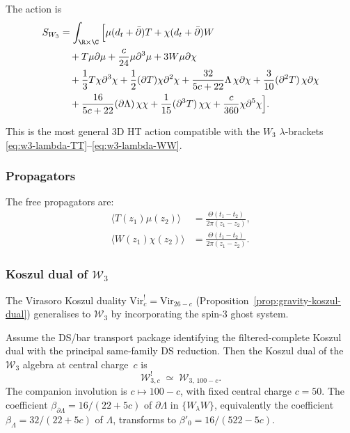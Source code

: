The action is
\begin{align}
S_{W_3} &= \int_{\R \times \C} \Big[ \mu (d_t + \bar{\partial})T + \chi (d_t + \bar{\partial})W \notag\\
&\quad + T \mu \partial \mu + \frac{c}{24} \mu \partial^3 \mu + 3W \mu \partial \chi \notag\\
&\quad + \frac{1}{3}T \chi \partial^3 \chi + \frac{1}{2}(\partial T) \chi \partial^2 \chi + \frac{32}{5c+22}\Lambda\, \chi \partial \chi + \frac{3}{10}(\partial^2 T)\,\chi \partial \chi \notag\\
&\quad + \frac{16}{5c+22}(\partial\Lambda)\, \chi \chi + \frac{1}{15}(\partial^3 T)\,\chi \chi + \frac{c}{360} \chi \partial^5 \chi \Big].
\end{align}

This is the most general 3D HT action compatible with the $W_3$ $\lambda$-brackets \eqref{eq:w3-lambda-TT}--\eqref{eq:w3-lambda-WW}.

\subsubsection{Propagators}

The free propagators are:
\begin{align}
\langle T(z_1) \mu(z_2) \rangle &= \frac{\Theta(t_1-t_2)}{2\pi(z_1-z_2)},\\
\langle W(z_1) \chi(z_2) \rangle &= \frac{\Theta(t_1-t_2)}{2\pi(z_1-z_2)}.
\end{align}


\subsubsection{Koszul dual of $\mathcal{W}_3$}
\label{subsubsec:w3-koszul-dual}
%
%

The Virasoro Koszul duality $\mathrm{Vir}_c^! = \mathrm{Vir}_{26-c}$
(Proposition~\ref{prop:gravity-koszul-dual})
generalises to $\mathcal{W}_3$ by incorporating the spin-$3$ ghost
system.

\begin{theorem}
\label{thm:w3-koszul-dual}
Assume the DS/bar transport package identifying the filtered-complete
Koszul dual with the principal same-family DS reduction. Then the
Koszul dual of the $\mathcal{W}_3$ algebra at central charge~$c$ is
\begin{equation}
\label{eq:w3-koszul-dual}
\mathcal{W}_{3,c}^!
\;\simeq\;
\mathcal{W}_{3,\,100-c}.
\end{equation}
The companion involution is $c \mapsto 100 - c$, with fixed central
charge $c = 50$. The coefficient
$\beta_{\partial\Lambda} = 16/(22+5c)$ of $\partial\Lambda$ in
$\{W_\lambda W\}$, equivalently the coefficient
$\beta_{\Lambda}=32/(22+5c)$ of $\Lambda$, transforms
to $\beta'_0 = 16/(522 - 5c)$.
\end{theorem}

